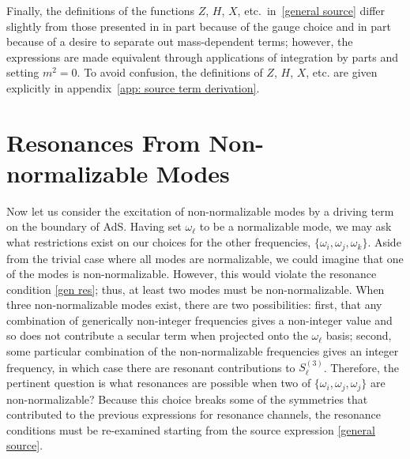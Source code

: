 \documentclass[letterpaper,11pt]{article}
\newcommand{\oi}{\omega_i}
\newcommand{\oj}{\omega_j}
\newcommand{\ok}{\omega_k}
\newcommand{\ol}{\omega_\ell}
\begin{document}
Finally, the definitions of the functions $Z$, $H$, $X$, etc.~in~\eqref{general source} differ slightly 
from those presented in \cite{1407.6273, 1412.3249} in part because of the gauge choice and in part because of 
a desire to separate out mass-dependent terms; however, the expressions are made equivalent through applications 
of integration by parts and setting $m^2 = 0$. To avoid confusion, 
the definitions of $Z$, $H$, $X$, etc. are given explicitly in 
appendix~\ref{app: source term derivation}.




\section{Resonances From Non-normalizable Modes}
\label{sec: NNmodes}

Now let us consider the excitation of non-normalizable modes by a driving term on the boundary of AdS. Having set $\ol$ to be a normalizable mode, we may ask what restrictions exist on our choices for the other frequencies, $\{ \oi, \oj, \ok \}$. Aside from the trivial case where all modes are normalizable, we could imagine that one of the modes is non-normalizable. However, this would violate the resonance condition \eqref{gen res}; thus, at least two modes must be non-normalizable. When three non-normalizable modes exist, there are two possibilities: first, that any combination of generically non-integer frequencies gives a non-integer value and so does not contribute a secular term when projected onto the $\omega_\ell$ basis; second, some particular combination of the non-normalizable frequencies gives an integer frequency, in which case there are resonant contributions to $S^{(3)}_\ell$. Therefore, the pertinent question is what resonances are possible when two of $\{\oi, \oj, \oj\}$ are non-normalizable? Because this choice breaks some of the symmetries that contributed to the previous expressions for resonance channels, the resonance conditions must be re-examined starting from the source expression \eqref{general source}.
\end{document}
